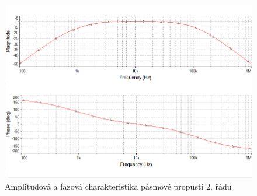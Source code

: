 \documentclass[twoside]{article}
\begin{document}
\begin{figure}[H]
\centering
\includegraphics[scale=0.75]{16065.png}
\caption{Amplitudová a fázová charakteristika pásmové propusti 2. řádu}
\end{figure}
\end{document}

